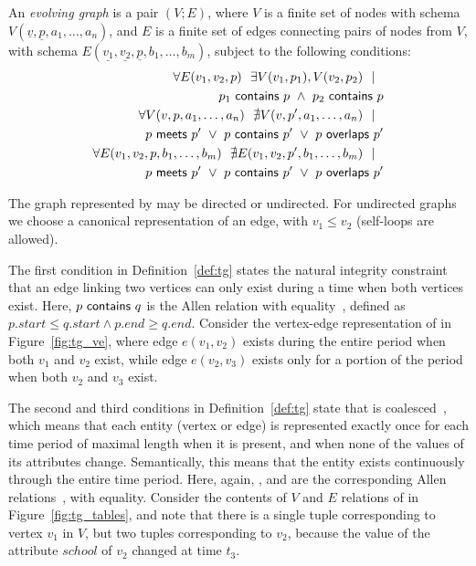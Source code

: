 \begin{definition}[TGraph]
An {\em evolving graph} \tg is a pair $(V; E)$, where $V$ is a finite
set of nodes with schema $V(\underline{v}, \underline{p}, a_1,
\ldots, a_n)$, and $E$ is a finite set of edges connecting pairs of
nodes from $V$, with schema $E(\underline{v_1}, \underline{v_2},
\underline{p}, b_1, \ldots, b_m)$, subject to the following
conditions:
\begin{align*}
\forall E(v_1, v_2, p)~~\exists V(v_1, p_1), V(v_2, p_2)~~|~~\\
                       p_1~\mathsf{contains}~p~\wedge~p_2~\mathsf{contains}~p\\
\forall V(v, p, a_1, \ldots, a_n)~~\nexists V(v, p', a_1, \ldots, a_n)~~|~~ \\
                       p~\mathsf{meets}~p'~\lor~p~\mathsf{contains}~p'~\lor~p~\mathsf{overlaps}~p'\\
\forall E(v_1, v_2, p,  b_1, \ldots, b_m)~~\nexists E(v_1,v_2, p', b_1, \ldots, b_m)~~|~~\\
                       p~\mathsf{meets}~p'~\lor~p~\mathsf{contains}~p'~\lor~p~\mathsf{overlaps}~p'
\end{align*}

\label{def:tg}
\end{definition}

The graph represented by \tg may be directed or undirected.  For
undirected graphs we choose a canonical representation of an edge, with
$v_1 \leq v_2$ (self-loops are allowed).

The first condition in Definition~\ref{def:tg} states the natural
integrity constraint that an edge linking two vertices can only exist
during a time when both vertices exist.  Here, $p~\mathsf{contains}~q$
is the Allen  relation with
equality~\cite{allen83}, defined as $p.start \leq q.start \wedge p.end
\geq q.end$.  Consider the vertex-edge representation of \tg
{} in Figure~\ref{fig:tg_ve}, where edge $e(v_1,v_2)$ exists
during the entire period when both $v_1$ and $v_2$ exist, while edge
$e(v_2,v_3)$ exists only for a portion of the period when both $v_2$
and $v_3$ exist.

The second and third conditions in Definition~\ref{def:tg} state that
\tg is coalesced~\cite{DBLP:conf/vldb/BohlenSS96}, which means that
each entity (vertex or edge) is represented exactly once for each time
period of maximal length when it is present, and when none of the
values of its attributes change.  Semantically, this means that the
entity exists continuously through the entire time period.  Here,
again, ,  and 
are the corresponding Allen relations~\cite{allen83}, with
equality. Consider the contents of $V$ and $E$ relations of 
in Figure~\ref{fig:tg_tables}, and note that there is a single tuple
corresponding to vertex $v_1$ in $V$, but two tuples corresponding to
$v_2$, because the value of the attribute $school$ of $v_2$ changed at
time $t_3$.

